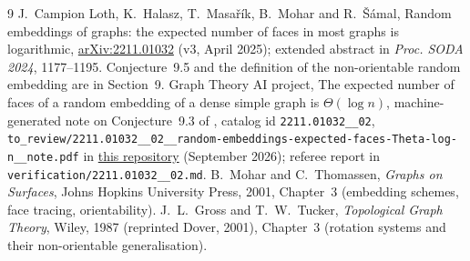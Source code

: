 \documentclass[11pt,a4paper]{article}
\theoremstyle{plain}
\theoremstyle{definition}
\theoremstyle{remark}
\begin{document}

\begin{thebibliography}{9}
\small
\setlength{\itemsep}{2pt}
 J.~Campion Loth, K.~Halasz, T.~Masařík, B.~Mohar and R.~Šámal, Random embeddings of graphs: the expected number of faces in most graphs is logarithmic, \href{https://arxiv.org/abs/2211.01032}{arXiv:2211.01032} (v3, April 2025); extended abstract in \emph{Proc. SODA 2024}, 1177--1195. Conjecture~9.5 and the definition of the non-orientable random embedding are in Section~9.
 Graph Theory AI project, The expected number of faces of a random embedding of a dense simple graph is $\Theta(\log n)$, machine-generated note on Conjecture~9.3 of \cite{CHMMS}, catalog id \texttt{2211.01032\_\_02}, \texttt{to\_review/2211.01032\_\_02\_\_random-embeddings-expected-faces-Theta-log-n\_\_note.pdf} in \href{https://github.com/graph-theory-AI/Graph-Theory-LLM-Proofs}{this repository} (September 2026); referee report in \texttt{verification/2211.01032\_\_02.md}.
 B.~Mohar and C.~Thomassen, \emph{Graphs on Surfaces}, Johns Hopkins University Press, 2001, Chapter~3 (embedding schemes, face tracing, orientability).
 J.~L.~Gross and T.~W.~Tucker, \emph{Topological Graph Theory}, Wiley, 1987 (reprinted Dover, 2001), Chapter~3 (rotation systems and their non-orientable generalisation).
\end{thebibliography}
\end{document}
